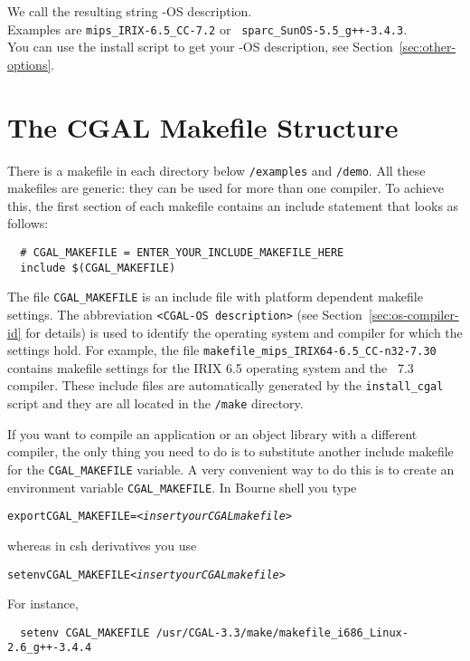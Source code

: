 We call the resulting string \cgal-OS description.\\ Examples are
\texttt{mips\_IRIX-6.5\_CC-7.2} or {\tt
  sparc\_SunOS-5.5\_g++-3.4.3}.\\ You can use the install script to
get your \cgal-OS description, see Section~\ref{sec:other-options}.

\section{The CGAL Makefile Structure\label{sec:makefiles}}

There is a makefile in each directory below \texttt{\cgaldir/examples}
and \texttt{\cgaldir/demo}. All these makefiles are generic: they can
be used for more than one compiler. To achieve this, the first section
of each makefile contains an include statement that looks as follows:
\begin{verbatim}
  # CGAL_MAKEFILE = ENTER_YOUR_INCLUDE_MAKEFILE_HERE
  include $(CGAL_MAKEFILE)
\end{verbatim}

The file \texttt{CGAL\_MAKEFILE} is an include
file with platform dependent makefile
settings. The abbreviation \texttt{<CGAL-OS description>} (see
Section~\ref{sec:os-compiler-id} for details) is used to identify the
operating system and compiler for which the settings hold. For
example, the file \texttt{makefile\_mips\_IRIX64-6.5\_CC-n32-7.30}
contains makefile settings for the IRIX 6.5 operating system and the
\mipsprocc\ 7.3 compiler.  These include files are automatically
generated by the \texttt{install\_cgal} script and they are all
located in the \texttt{\cgaldir/make} directory.

If you want to compile an application or an object library with a
different compiler, the only thing you need to do is to substitute
another include makefile for the \texttt{CGAL\_MAKEFILE} variable. A
very convenient way to do this is to create an environment variable
\texttt{CGAL\_MAKEFILE}. In Bourne shell you type
\begin{alltt}
  export CGAL_MAKEFILE=<\textit{insert your CGAL makefile}>
\end{alltt}
whereas in csh derivatives you use
\begin{alltt}
  setenv CGAL_MAKEFILE <\textit{insert your CGAL makefile}>
\end{alltt}
For instance,
\begin{verbatim}
  setenv CGAL_MAKEFILE /usr/CGAL-3.3/make/makefile_i686_Linux-2.6_g++-3.4.4
\end{verbatim}

